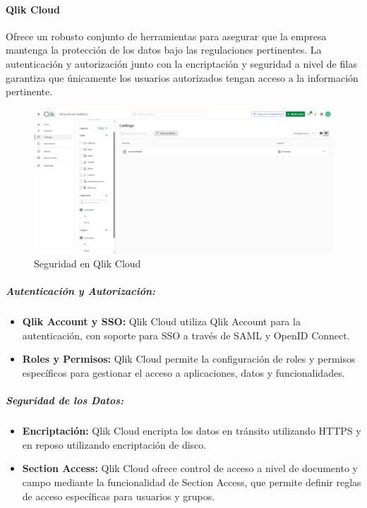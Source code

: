 \documentclass[
  11pt,
  bookmarksnumbered]{article}
\begin{document}
\hypertarget{qlik-cloud-1}{%
\paragraph{Qlik Cloud}\label{qlik-cloud-1}}

Ofrece un robusto conjunto de herramientas para asegurar que la empresa mantenga la protección de los datos bajo las regulaciones pertinentes. La autenticación y autorización junto con la encriptación y seguridad a nivel de filas garantiza que únicamente los usuarios autorizados tengan acceso a la información pertinente.

\begin{figure}

{\centering \includegraphics[width=4.68in]{media 2/image15} 

}

\caption{Seguridad en Qlik Cloud}\label{fig:unnamed-chunk-21}
\end{figure}

\hypertarget{autenticaciuxf3n-y-autorizaciuxf3n-2}{%
\subparagraph{Autenticación y Autorización:}\label{autenticaciuxf3n-y-autorizaciuxf3n-2}}

\begin{itemize}
\item
  \textbf{Qlik Account y SSO:} Qlik Cloud utiliza Qlik Account para la autenticación, con soporte para SSO a través de SAML y OpenID Connect.
\item
  \textbf{Roles y Permisos:} Qlik Cloud permite la configuración de roles y permisos específicos para gestionar el acceso a aplicaciones, datos y funcionalidades.
\end{itemize}

\hypertarget{seguridad-de-los-datos-2}{%
\subparagraph{Seguridad de los Datos:}\label{seguridad-de-los-datos-2}}

\begin{itemize}
\item
  \textbf{Encriptación:} Qlik Cloud encripta los datos en tránsito utilizando HTTPS y en reposo utilizando encriptación de disco.
\item
  \textbf{Section Access:} Qlik Cloud ofrece control de acceso a nivel de documento y campo mediante la funcionalidad de Section Access, que permite definir reglas de acceso específicas para usuarios y grupos.
\end{itemize}
\end{document}
